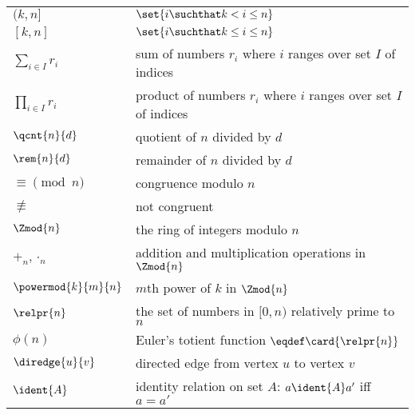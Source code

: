 \begin{center}
\begin{tabular}{ll}
$(k, n]$       & $\set{i \suchthat k < i \le n}$\\
$[k,n]$        & $\set{i \suchthat k \le i \le n}$\\
$\sum_{i \in I} r_i$ & sum of numbers $r_i$ where $i$ ranges over
set $I$ of indices\\
$\prod_{i \in I} r_i$ & product of numbers $r_i$ where $i$ ranges over
set $I$ of indices\\
$\qcnt{n}{d}$  & quotient of $n$ divided by $d$\\
$\rem{n}{d}$   & remainder of $n$ divided by $d$\\
$\equiv \pmod{n}$ & congruence modulo $n$\\
$\not\equiv$   & not congruent\\
$\Zmod{n}$     & the ring of integers modulo $n$\\
$+_n, \cdot_n$ & addition and multiplication operations in $\Zmod{n}$\\
$\powermod{k}{m}{n}$  & $m$th power of $k$ in $\Zmod{n}$\\
$\relpr{n}$    & the set of numbers in $[0,n)$ relatively prime to $n$\\
$\phi(n)$      & Euler's totient function $\eqdef \card{\relpr{n}}$\\
$\diredge{u}{v}$ & directed edge from vertex $u$ to vertex $v$\\
$\ident{A}$    & identity relation on set $A$: $a \ident{A} a'$ iff $a = a'$
\end{tabular}
\end{center}


